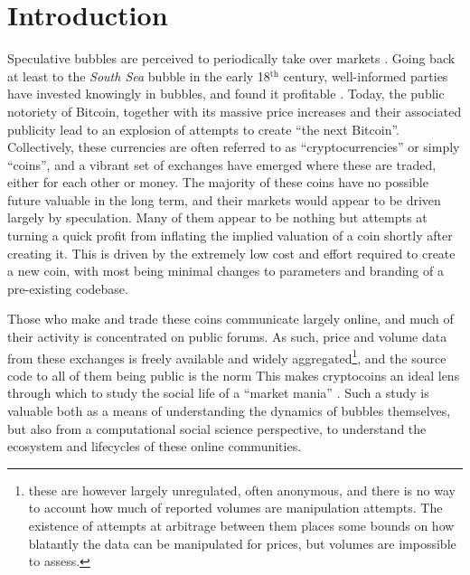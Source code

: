 \section{Introduction}

Speculative bubbles are perceived to periodically take over markets \cite{garber2001famous}.
Going back at least to the \emph{South Sea} bubble in the early 18$^{\text{th}}$ century, well-informed parties  have invested knowingly in bubbles, and found it profitable \cite{temin2004riding}.
Today, the public notoriety of Bitcoin, together with its massive price increases and their associated publicity lead to an explosion of attempts to create ``the next Bitcoin''.
Collectively, these currencies are often referred to as ``cryptocurrencies'' or simply ``coins'', and a vibrant set of exchanges have emerged where these are traded, either for each other or money.
The majority of these coins have no possible future valuable in the long term, and their markets would appear to be driven largely by speculation.
Many of them appear to be nothing but attempts at turning a quick profit from inflating the implied valuation of a coin shortly after creating it.
This is driven by the extremely low cost and effort required to create a new coin, with most being minimal changes to parameters and branding of a pre-existing codebase.

Those who make and trade these coins communicate largely online, and much of their activity is concentrated on public forums. 
As such, price and volume data from these exchanges is freely available and widely aggregated\footnote{ these are however largely unregulated, often anonymous, and there is no way to account how much of reported volumes are manipulation attempts. The existence of attempts at arbitrage between them places some bounds on how blatantly the data can be manipulated for prices, but volumes are impossible to assess. },
and the source code to all of them being public is the norm%
This makes cryptocoins
an ideal lens through which to study the social life of a ``market mania'' \cite{cosma2008}.
Such a study is valuable both as a means of understanding the dynamics of bubbles themselves, but also from a computational social science perspective, to understand the ecosystem and lifecycles of these online communities.


